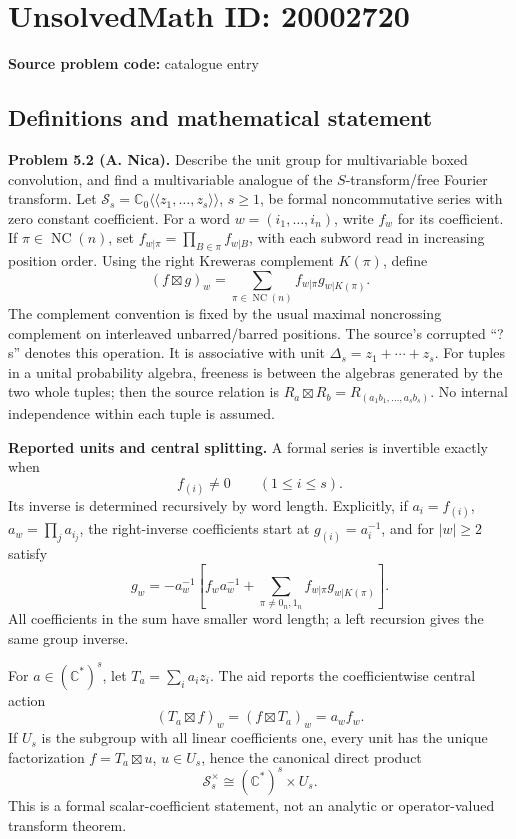 \documentclass[11pt]{article}
\newcommand{\C}{\mathbb{C}}
\begin{document}
\section*{UnsolvedMath ID: 20002720}
\textbf{Source problem code:} catalogue entry
\subsection{Definitions and mathematical statement}
\textbf{Problem 5.2 (A. Nica).} Describe the unit group for multivariable boxed convolution, and find a multivariable analogue of the \(S\)-transform/free Fourier transform. Let \(\mathcal S_s=\C_0\langle\!\langle z_1,\ldots,z_s\rangle\!\rangle\), \(s\geq1\), be formal noncommutative series with zero constant coefficient. For a word \(w=(i_1,\ldots,i_n)\), write \(f_w\) for its coefficient. If \(\pi\in\operatorname{NC}(n)\), set \(f_{w|\pi}=\prod_{B\in\pi}f_{w|B}\), with each subword read in increasing position order. Using the right Kreweras complement \(K(\pi)\), define
\[
 (f\boxtimes g)_w=\sum_{\pi\in\operatorname{NC}(n)}
 f_{w|\pi}g_{w|K(\pi)}.
\]
The complement convention is fixed by the usual maximal noncrossing complement on interleaved unbarred/barred positions. The source's corrupted ``?s'' denotes this operation. It is associative with unit \(\Delta_s=z_1+\cdots+z_s\). For tuples in a unital probability algebra, freeness is between the algebras generated by the two whole tuples; then the source relation is \(R_a\boxtimes R_b=R_{(a_1b_1,\ldots,a_sb_s)}\). No internal independence within each tuple is assumed.

\textbf{Reported units and central splitting.} A formal series is invertible exactly when
\[
 f_{(i)}\ne0\qquad(1\leq i\leq s).
\]
Its inverse is determined recursively by word length. Explicitly, if \(a_i=f_{(i)}\), \(a_w=\prod_ja_{i_j}\), the right-inverse coefficients start at \(g_{(i)}=a_i^{-1}\), and for \(|w|\geq2\) satisfy
\[
 g_w=-a_w^{-1}\left[f_wa_w^{-1}
 +\sum_{\pi\ne0_n,1_n}f_{w|\pi}g_{w|K(\pi)}\right].
\]
All coefficients in the sum have smaller word length; a left recursion gives the same group inverse.

For \(a\in(\C^*)^s\), let \(T_a=\sum_i a_iz_i\). The aid reports the coefficientwise central action
\[
 (T_a\boxtimes f)_w=(f\boxtimes T_a)_w=a_wf_w.
\]
If \(U_s\) is the subgroup with all linear coefficients one, every unit has the unique factorization \(f=T_a\boxtimes u\), \(u\in U_s\), hence the canonical direct product
\[
 \mathcal S_s^\times\cong(\C^*)^s\times U_s.
\]
This is a formal scalar-coefficient statement, not an analytic or operator-valued transform theorem.
\end{document}

